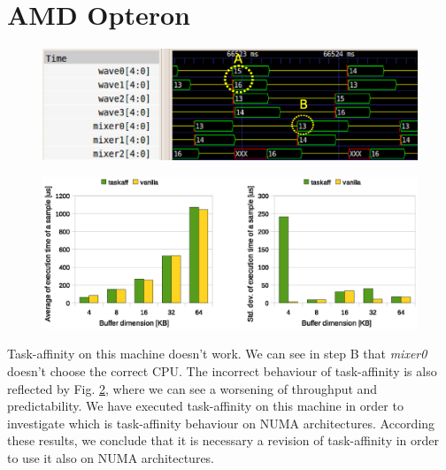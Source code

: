 \newpage
\section{AMD Opteron}

\begin{figure}[htbp]
\centering
\includegraphics[width=\widefigure]{images/results_AMD/final_AMD.eps}
\caption{}
\label{fig:trace_AMD}
\end{figure}

\begin{figure}[htbp]
\centering
\includegraphics[width=\widefigure]{images/results_AMD/time_avg_var_AMD.eps}
\caption{}
\label{fig:time_avg_var_AMD}
\end{figure}

Task-affinity on this machine doesn't work. We can see in step B that \textit{mixer0} doesn't choose the correct CPU. The incorrect behaviour of 
task-affinity is also reflected by Fig. \ref{fig:time_avg_var_AMD}, where we can see a worsening of throughput and predictability. We have executed 
task-affinity on this machine in order to investigate which is task-affinity behaviour on NUMA architectures. According these results, we conclude that 
it is necessary a revision of task-affinity in order to use it also on NUMA architectures.

